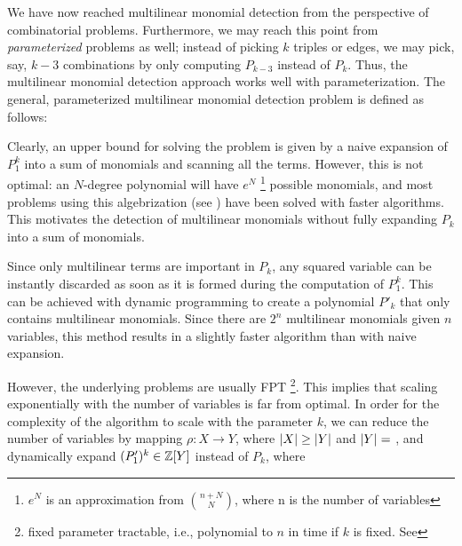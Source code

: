 We have now reached multilinear monomial detection from the perspective 
of combinatorial problems. Furthermore, we may reach this point from 
\emph{parameterized} problems as well; instead of picking $k$ triples or edges, 
we may pick, say, $k-3$ combinations by only computing $P_{k-3}$ instead of $P_k$. 
Thus, the multilinear monomial detection approach works well with parameterization. 
The general, parameterized multilinear monomial detection problem is defined as follows: 

\begin{problem}
\end{problem}

Clearly, an upper bound for solving the problem is given by a 
naive expansion of $P_1^k$ into a sum of monomials and scanning all the terms. 
However, this is not optimal: an $N$-degree polynomial will have $e^N$
\footnote{$e^N$ is an approximation from $\binom{n+N}{N}$, where n is the number of variables} 
possible monomials, and most problems using this algebrization 
(see ) 
have been solved with faster algorithms. 
This motivates the detection of multilinear monomials 
without fully expanding $P_k$ into a sum of monomials.

Since only multilinear terms are important in $P_k$, 
any squared variable can be instantly discarded as 
soon as it is formed 
during the computation of $P_1^k$. 
This can be achieved with dynamic programming 
to create a polynomial $P'_k$ that 
only contains multilinear monomials. 
Since there are $2^n$ multilinear monomials given $n$ variables, 
this method results in a slightly 
faster algorithm than with naive expansion.

However, the underlying problems are usually FPT
\footnote{fixed parameter tractable, i.e., 
polynomial to $n$ in time if $k$ is fixed. See }. 
This implies that scaling exponentially 
with the number of variables is far from optimal. 
In order for the complexity of the algorithm to scale 
with the parameter $k$, we can reduce the number of variables 
by mapping $\rho \colon X \to Y$, where 
${\left\vert X\right\vert} \geq {\left\vert Y\right\vert}$ and ${\left\vert Y\right\vert} =$ , 
and dynamically expand $(P'_1)^k \in \mathbb Z[Y]$ instead of
$P_k$, where

